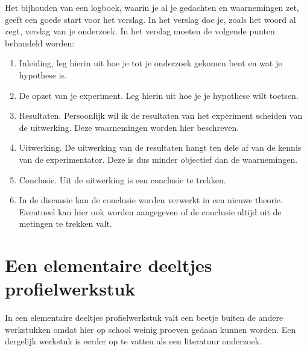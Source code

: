 Het bijhouden van een logboek, waarin je al je gedachten en waarnemingen
zet, geeft een goede start voor het verslag. In het verslag doe je,
zoals het woord al zegt, verslag van je onderzoek. In het verslag
moeten de volgende punten behandeld worden:
\begin{enumerate}
\item Inleiding, leg hierin uit hoe je tot je onderzoek gekomen bent en
wat je hypothese is.
\item De opzet van je experiment. Leg hierin uit hoe je je hypothese wilt
toetsen.
\item Resultaten. Persoonlijk wil ik de resultaten van het experiment scheiden
van de uitwerking. Deze waarnemingen worden hier beschreven.
\item Uitwerking. De uitwerking van de resultaten hangt ten dele af van
de kennis van de experimentator. Deze is dus minder objectief dan
de waarnemingen.
\item Conclusie. Uit de uitwerking is een conclusie te trekken.
\item In de discussie kan de conclusie worden verwerkt in een nieuwe theorie.
Eventueel kan hier ook worden aangegeven of de conclusie altijd uit
de metingen te trekken valt.
\end{enumerate}

\section{Een elementaire deeltjes profielwerkstuk}

In een elementaire deeltjes profielwerkstuk valt een beetje buiten
de andere werkstukken omdat hier op school weinig proeven gedaan kunnen
worden. Een dergelijk werkstuk is eerder op te vatten als een literatuur
onderzoek.


